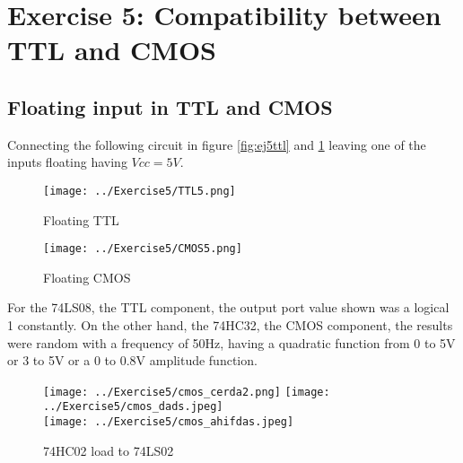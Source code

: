 %

%

%
%
%

\section{\color{olive}Exercise 5: Compatibility between TTL and CMOS}

\subsection{\color{purple}Floating input in TTL and CMOS}

Connecting the following circuit in figure \ref{fig:ej5ttl} and \ref{fig:ej5cmos} leaving one of the inputs floating having $Vcc = 5V$. 

\begin{figure}[h!]
         \begin{minipage}{.47\linewidth}
        \centering
        \texttt{[image: ../Exercise5/TTL5.png]}
        \caption{\color{cyan}Floating TTL}
        \label{fig:ej5ttl}
        \end{minipage}
         \begin{minipage}{.5\linewidth}
        \centering
        \texttt{[image: ../Exercise5/CMOS5.png]}
        \caption{\color{cyan}Floating CMOS}
        \label{fig:ej5cmos}
    \end{minipage}
\end{figure}

For the 74LS08, the TTL component, the output port value shown was a logical 1 constantly. On the other hand, the 74HC32, the CMOS component, the results were random with a frequency of 50Hz, having a quadratic function from 0 to 5V or 3 to 5V or a 0 to 0.8V amplitude function.

\begin{figure}[h!]
        \centering
        \texttt{[image: ../Exercise5/cmos\_cerda2.png]}\hspace{1cm}
        \texttt{[image: ../Exercise5/cmos\_dads.jpeg]}\\
		\vspace{0.2cm}
	   \texttt{[image: ../Exercise5/cmos\_ahifdas.jpeg]} 
        \caption{\color{cyan}74HC02 load to 74LS02}
        \label{fig:ej2exhctols}
    \end{figure}

